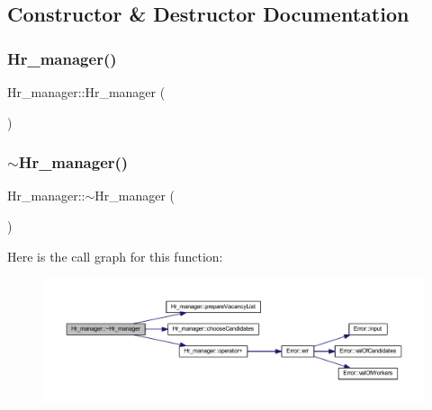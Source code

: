 \subsection{Constructor \& Destructor Documentation}
\hypertarget{class_hr__manager_a887008e77b1f49947fc52ace7b36212b}{}\label{class_hr__manager_a887008e77b1f49947fc52ace7b36212b} 
\subsubsection{\texorpdfstring{Hr\+\_\+manager()}{Hr\_manager()}}
{\footnotesize\ttfamily Hr\+\_\+manager\+::\+Hr\+\_\+manager (\begin{DoxyParamCaption}{ }\end{DoxyParamCaption})\hspace{0.3cm}{\ttfamily [inline]}}

\hypertarget{class_hr__manager_a6713d753a80cf4346da53d52876e751f}{}\label{class_hr__manager_a6713d753a80cf4346da53d52876e751f} 
\subsubsection{\texorpdfstring{$\sim$\+Hr\+\_\+manager()}{~Hr\_manager()}}
{\footnotesize\ttfamily Hr\+\_\+manager\+::$\sim$\+Hr\+\_\+manager (\begin{DoxyParamCaption}{ }\end{DoxyParamCaption})\hspace{0.3cm}{\ttfamily [inline]}}

Here is the call graph for this function\+:
\nopagebreak
\begin{figure}[H]
\begin{center}
\leavevmode
\includegraphics[width=350pt]{class_hr__manager_a6713d753a80cf4346da53d52876e751f_cgraph}
\end{center}
\end{figure}


